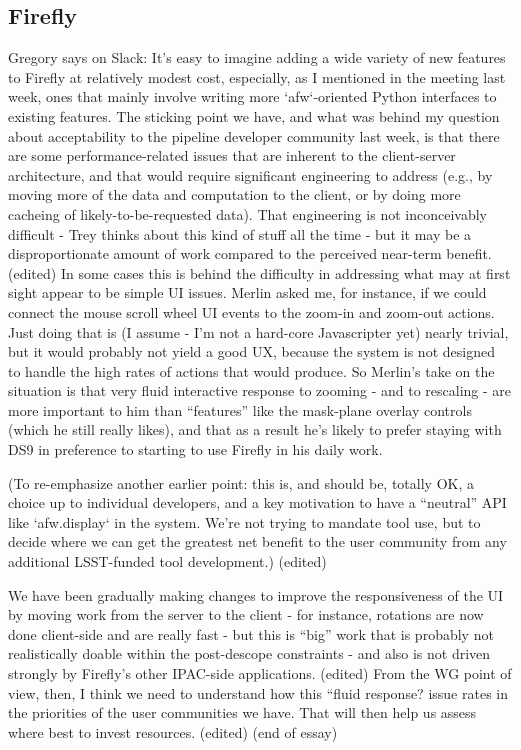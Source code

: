 
\subsection{Firefly}

Gregory says on Slack:
It's easy to imagine adding a wide variety of new features to Firefly at relatively modest cost, especially, as I mentioned in the meeting last week, ones that mainly involve writing more `afw`-oriented Python interfaces to existing features.
The sticking point we have, and what was behind my question about acceptability to the pipeline developer community last week, is that there are some performance-related issues that are inherent to the client-server architecture, and that would require significant engineering to address (e.g., by moving more of the data and computation to the client, or by doing more cacheing of likely-to-be-requested data). That engineering is not inconceivably difficult - Trey thinks about this kind of stuff all the time - but it may be a disproportionate amount of work compared to the perceived near-term benefit. (edited)
In some cases this is behind the difficulty in addressing what may at first sight appear to be simple UI issues. Merlin asked me, for instance, if we could connect the mouse scroll wheel UI events to the zoom-in and zoom-out actions. Just doing that is (I assume - I'm not a hard-core Javascripter yet) nearly trivial, but it would probably not yield a good UX, because the system is not designed to handle the high rates of actions that would produce.
So Merlin's take on the situation is that very fluid interactive response to zooming - and to rescaling - are more important to him than ``features'' like the mask-plane overlay controls (which he still really likes), and that as a result he's likely to prefer staying with DS9 in preference to starting to use Firefly in his daily work.

(To re-emphasize another earlier point: this is, and should be, totally OK, a choice up to individual developers, and a key motivation to have a ``neutral'' API like `afw.display` in the system. We're not trying to mandate tool use, but to decide where we can get the greatest net benefit to the user community from any additional LSST-funded tool development.) (edited)

We have been gradually making changes to improve the responsiveness of the UI by moving work from the server to the client - for instance, rotations are now done client-side and are really fast - but this is ``big'' work that is probably not realistically doable within the post-descope constraints - and also is not driven strongly by Firefly's other IPAC-side applications. (edited)
From the WG point of view, then, I think we need to understand how this ``fluid response? issue rates in the priorities of the user communities we have. That will then help us assess where best to invest resources. (edited)
(end of essay)


